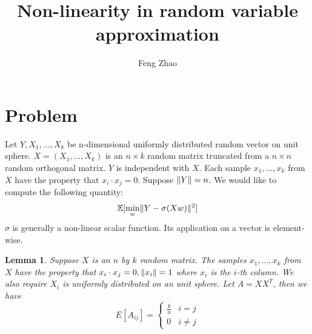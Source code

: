 \documentclass{article}
\title{Non-linearity in random variable approximation}
\author{Feng Zhao}
\DeclarePairedDelimiter\norm{\lVert}{\rVert}
\def\E{\mathbb{E}}
\newtheorem{lemma}{Lemma}
\begin{document}
\maketitle
\section{Problem}
Let $Y, X_1, \dots, X_k$ be n-dimensional uniformly distributed random vector on unit sphere. $X=(X_1, \dots, X_k)$ is an $n\times k$ random matrix truncated from a $n\times n$ random orthogonal matrix. $Y$ is independent with $X$. Each sample $x_1, \dots, x_k$ from $X$ have the property that $x_i \cdot x_j = 0$. Suppose $\norm{Y}=n$. We would like to compute the following quantity:
\begin{equation}\label{eq:Eminw}
\E[\min_w \norm{Y - \sigma (X w ) }^2]
\end{equation}
$\sigma$ is generally a non-linear scalar function. Its application on a vector is element-wise.
\begin{lemma}\label{lem:uniform}
Suppose $X$ is an $n$ by $k$ random matrix. The samples $x_1, \dots, x_k$ from $X$ have the property that $x_i \cdot x_j = 0, \norm{x_i}=1$ where $x_i$ is the $i$-th column.  We also require $X_i$ is uniformly distributed on an unit sphere. Let $A=X X^T$, then we have
\begin{equation}
E[A_{ij}]= \begin{cases}
\frac{k}{n} & i = j\\
0 & i\neq j 
\end{cases}
\end{equation}
\end{lemma}
\end{document}
